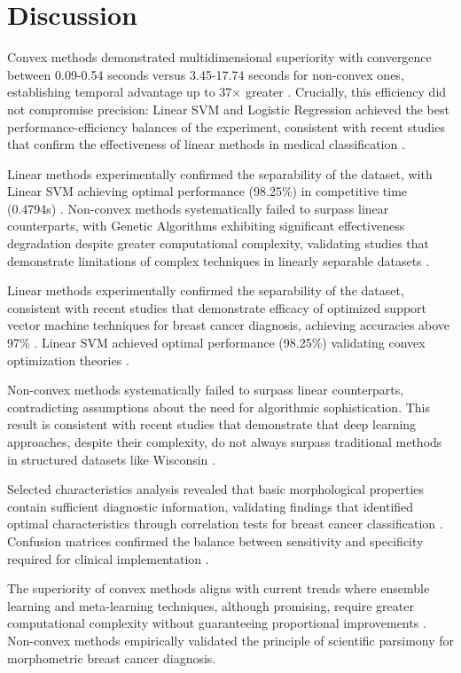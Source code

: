 \documentclass[conference]{IEEEtran}
\begin{document}
\section{Discussion}
Convex methods demonstrated multidimensional superiority with convergence between 0.09-0.54 seconds versus 3.45-17.74 seconds for non-convex ones, establishing temporal advantage up to 37× greater \cite{boyd2004}. Crucially, this efficiency did not compromise precision: Linear SVM and Logistic Regression achieved the best performance-efficiency balances of the experiment, consistent with recent studies that confirm the effectiveness of linear methods in medical classification \cite{sharma2024}.

Linear methods experimentally confirmed the separability of the dataset, with Linear SVM achieving optimal performance (98.25\%) in competitive time (0.4794s) \cite{vapnik1995}. Non-convex methods systematically failed to surpass linear counterparts, with Genetic Algorithms exhibiting significant effectiveness degradation despite greater computational complexity, validating studies that demonstrate limitations of complex techniques in linearly separable datasets \cite{chen2023}.

Linear methods experimentally confirmed the separability of the dataset, consistent with recent studies that demonstrate efficacy of optimized support vector machine techniques for breast cancer diagnosis, achieving accuracies above 97\% \cite{bilal2024}. Linear SVM achieved optimal performance (98.25\%) validating convex optimization theories \cite{boyd2004}.

Non-convex methods systematically failed to surpass linear counterparts, contradicting assumptions about the need for algorithmic sophistication. This result is consistent with recent studies that demonstrate that deep learning approaches, despite their complexity, do not always surpass traditional methods in structured datasets like Wisconsin \cite{ahmad2024}. 

Selected characteristics analysis revealed that basic morphological properties contain sufficient diagnostic information, validating findings that identified optimal characteristics through correlation tests for breast cancer classification \cite{chen2023}. Confusion matrices confirmed the balance between sensitivity and specificity required for clinical implementation \cite{fawcett2006}.

The superiority of convex methods aligns with current trends where ensemble learning and meta-learning techniques, although promising, require greater computational complexity without guaranteeing proportional improvements \cite{zheng2023, sharma2024}. Non-convex methods empirically validated the principle of scientific parsimony for morphometric breast cancer diagnosis.
\end{document}
